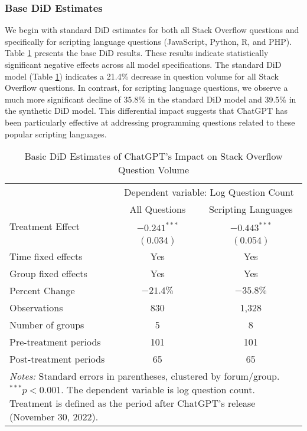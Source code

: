 \subsubsection{Base DiD Estimates}
We begin with standard DiD estimates for both all Stack Overflow questions and specifically for scripting language questions (JavaScript, Python, R, and PHP). Table \ref{tab:did_results} presents the base DiD results. These results indicate statistically significant negative effects across all model specifications. The standard DiD model (Table \ref{tab:did_results}) indicates a 21.4\% decrease in question volume for all Stack Overflow questions. In contrast, for scripting language questions, we observe a much more significant decline of 35.8\% in the standard DiD model and 39.5\% in the synthetic DiD model. This differential impact suggests that ChatGPT has been particularly effective at addressing programming questions related to these popular scripting languages.

\begin{table}[htpb!]
    \centering
    \caption{Basic DiD Estimates of ChatGPT's Impact on Stack Overflow Question Volume}
    \label{tab:did_results}
    \begin{tabular}{lcc}
        \toprule
            & \multicolumn{2}{c}{Dependent variable: Log Question Count} \\
            \cmidrule(lr){2-3}
            & All Questions & Scripting Languages \\
        \midrule
            Treatment Effect & $-0.241^{***}$ & $-0.443^{***}$ \\
            & $(0.034)$ & $(0.054)$ \\
        \midrule
            Time fixed effects & Yes & Yes \\
            Group fixed effects & Yes & Yes \\
            Percent Change & $-21.4\%$ & $-35.8\%$ \\
        \midrule
            Observations & 830 & 1,328 \\
            Number of groups & 5 & 8 \\
            Pre-treatment periods & 101 & 101 \\
            Post-treatment periods & 65 & 65 \\
        \bottomrule
            \multicolumn{3}{p{0.95\linewidth}}{\footnotesize \textit{Notes:} Standard errors in parentheses, clustered by forum/group. $^{***}p<0.001$. The dependent variable is log question count. Treatment is defined as the period after ChatGPT's release (November 30, 2022).} \\
    \end{tabular}
\end{table}

